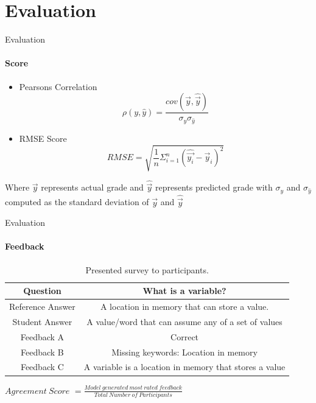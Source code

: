 \documentclass[aspectratio=169]{beamer}
\begin{document}
\section{Evaluation}
\begin{frame}{Evaluation}
	\framesubtitle{Score}
	\begin{itemize}
		\item Pearsons Correlation
		\begin{equation}
		\label{equation:pearson correlation}
		\rho(y,\hat{y}) = \frac{cov(\vec{y},\hat{\vec{y}})}{\sigma_y \sigma_{\hat{y}}}
		\end{equation}
		\item RMSE Score
		\begin{equation}
		\label{equation:Root mean square error}
		RMSE = \sqrt{\frac{1}{n}\Sigma_{i=1}^n(\hat{\vec{y_i}} - \vec{y}_i)^2}
		\end{equation}
	\end{itemize}
Where $\vec{y}$ represents actual grade and $\hat{\vec{y}}$ represents predicted grade with $\sigma_y$ and $\sigma_{\hat{y}}$ computed as the standard deviation of $\vec{y}$ and $\hat{\vec{y}}$
\end{frame}
\begin{frame}{Evaluation}
\framesubtitle{Feedback}
\begin{table}
	\begin{center}
		\begin{tabular}{ |c|c| }
			\hline
			\cellcolor{Gray}Question & \cellcolor{Gray}What is a variable?  
			\\ \hline 
			Reference Answer & A location in memory that can store a value.
			\\ \hline
			\cellcolor{Gray}Student Answer & \cellcolor{Gray}A value/word that can assume any of a set of values
			\\ \hline
			Feedback A & Correct
			\\ \hline
			\cellcolor{Gray}Feedback B & \cellcolor{Gray}Missing keywords: Location in memory
			\\ \hline
			Feedback C & A variable is a location in memory that stores a value
			\\ \hline
		\end{tabular}
		\caption{Presented survey to participants.}
		\label{table:language models}
	\end{center}
\end{table}
\centering
$Agreement\ Score$ $= \frac{Model\ generated\ most\ rated\ feedback}{Total\ Number\ of\ Participants}$
\end{frame}
\end{document}

